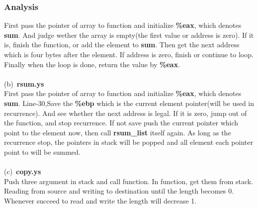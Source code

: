 \documentclass{article}
\begin{document}
\subsubsection{Analysis}
First pass the pointer of array to function and initialize \textbf{\%eax}, which denotes \textbf{sum}. And judge wether the array is empty(the first value or address is zero). If it is, finish the function, or add the element to \textbf{sum}. Then get the next address which is four bytes after the element. If address is zero, finish or continue to loop. Finally when the loop is done, return the value by \textbf{\%eax}.\\ \\
(b)\ \textbf{rsum.ys}\\
First pass the pointer of array to function and initialize \textbf{\%eax}, which denotes \textbf{sum}. Line-30,Save the \textbf{\%ebp} which is the current element pointer(will be used in recurrence). And see whether the next address is legal. If it is zero, jump out of the function, and stop recurrence. If not save push the current pointer which point to the element now, then call \textbf{rsum\_list} itself again. As long as the recurrence stop, the pointers in stack will be popped and all element each pointer point to will be summed.\\ \\
(c)\ \textbf{copy.ys}\\
Push three argument in stack and call function. In function, get them from stack. Reading from source and writing to destination until the length becomes 0. Whenever succeed to read and write the length will decrease 1.
\end{document}
